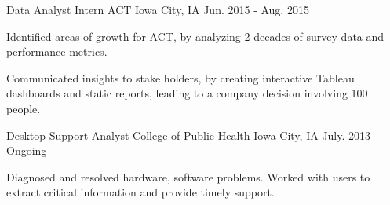 \begin{cventries}
{    }
  \cventry
    {Data Analyst Intern}
    {ACT}
    {Iowa City, IA}
    {Jun. 2015 - Aug. 2015}
    {
      \begin{cvitems}
        \item {Identified areas of growth for ACT, by analyzing 2 decades of survey data and performance metrics.}
        \item {Communicated insights to stake holders, by creating interactive Tableau dashboards and static reports, leading to a company decision involving 100 people.}
      \end{cvitems}
    }
  \cventry
    {Desktop Support Analyst}
    {College of Public Health}
    {Iowa City, IA}
    {July. 2013 - Ongoing}
    {
      \begin{cvitems}
        \item {Diagnosed and resolved hardware, software problems. Worked with users to extract critical information and provide timely support. }
      \end{cvitems}
    }
\end{cventries}
